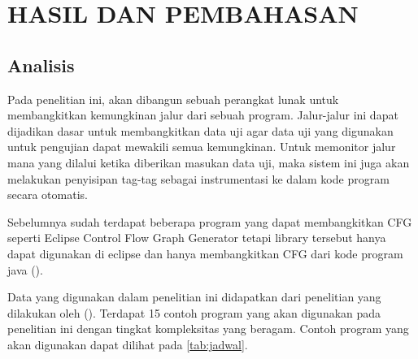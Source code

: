 \section*{HASIL DAN PEMBAHASAN}

\subsection*{Analisis}
Pada penelitian ini, akan dibangun sebuah perangkat lunak untuk membangkitkan kemungkinan jalur dari sebuah program. Jalur-jalur ini dapat dijadikan dasar untuk membangkitkan data uji agar data uji yang digunakan untuk pengujian dapat mewakili semua kemungkinan. Untuk memonitor jalur mana yang dilalui ketika diberikan masukan data uji, maka sistem ini juga akan melakukan penyisipan tag-tag sebagai instrumentasi ke dalam kode program secara otomatis.

Sebelumnya sudah terdapat beberapa program yang dapat membangkitkan CFG seperti Eclipse Control Flow Graph Generator tetapi library tersebut hanya dapat digunakan di eclipse dan hanya membangkitkan CFG dari kode program java (\cite{ALIMUCAJ2009}).

Data yang digunakan dalam penelitian ini didapatkan dari penelitian yang dilakukan oleh \citeauthor{HERMADI2015} (\cite*{HERMADI2015}). Terdapat 15 contoh program yang akan digunakan pada penelitian ini dengan tingkat kompleksitas yang beragam. Contoh program yang akan digunakan dapat dilihat pada \ref{tab:jadwal}.

